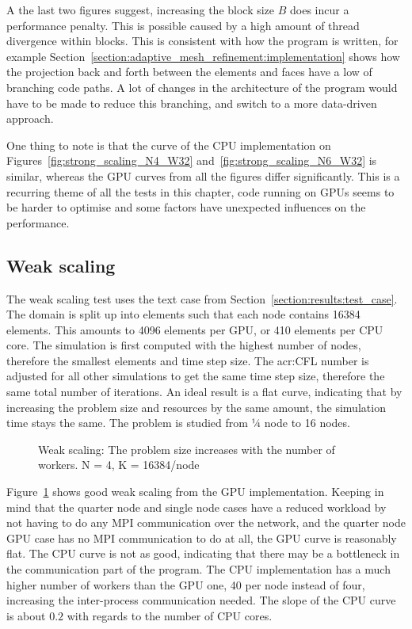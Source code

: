 A the last two figures suggest, increasing the block size $B$ does incur a performance penalty. This
is possible caused by a high amount of thread divergence within blocks. This is consistent with how
the program is written, for example Section~\ref{section:adaptive_mesh_refinement:implementation}
shows how the projection back and forth between the elements and faces have a low of branching code
paths. A lot of changes in the architecture of the program would have to be made to reduce this
branching, and switch to a more data-driven approach.

One thing to note is that the curve of the CPU implementation on
Figures~\ref{fig:strong_scaling_N4_W32} and~\ref{fig:strong_scaling_N6_W32} is similar, whereas the
GPU curves from all the figures differ significantly. This is a recurring theme of all the tests in
this chapter, code running on GPUs seems to be harder to optimise and some factors have unexpected
influences on the performance.

\subsection{Weak scaling} \label{subsection:results:scaling_tests:weak}

The weak scaling test uses the text case from Section~\ref{section:results:test_case}. The domain is
split up into elements such that each node contains 16384 elements. This amounts to 4096 elements
per GPU, or 410 elements per CPU core. The simulation is first computed with the highest number of
nodes, therefore the smallest elements and time step size. The \acrshort{acr:CFL} number is adjusted for all other
simulations to get the same time step size, therefore the same total number of iterations. An ideal
result is a flat curve, indicating that by increasing the problem size and resources by the same
amount, the simulation time stays the same. The problem is studied from ¼ node to 16 nodes.

\begin{figure}[H]
	\centering
	
	\caption{Weak scaling: The problem size increases with the number of workers. N = 4, K = 16384/node}
	\label{fig:weak_scaling}
\end{figure}

Figure~\ref{fig:weak_scaling} shows good weak scaling from the GPU implementation. Keeping in mind
that the quarter node and single node cases have a reduced workload by not having to do any MPI
communication over the network, and the quarter node GPU case has no MPI communication to do at all,
the GPU curve is reasonably flat. The CPU curve is not as good, indicating that there may be a
bottleneck in the communication part of the program. The CPU implementation has a much higher number
of workers than the GPU one, 40 per node instead of four, increasing the inter-process communication
needed. The slope of the CPU curve is about $0.2$ with regards to the number of CPU cores. 

